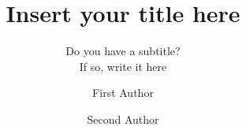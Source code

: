 %
%
%
%
%
%
\RequirePackage{fix-cm}
%
\documentclass[smallextended]{svjour3}       %
%
\smartqed  %
%
\usepackage{graphicx}
%
%
%
%
%


\title{Insert your title here%
}
\subtitle{Do you have a subtitle?\\ If so, write it here}


\author{First Author         \and
        Second Author %
}



